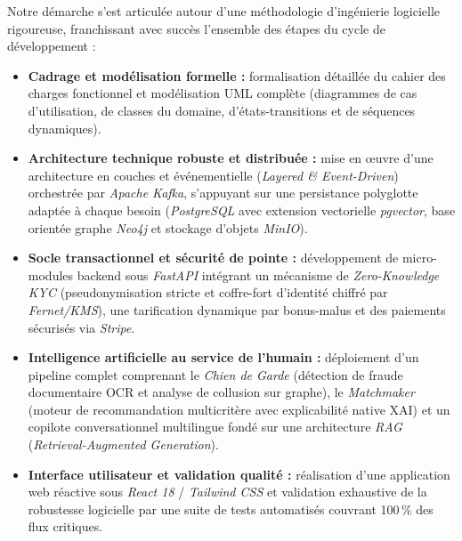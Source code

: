 \documentclass[12pt,a4paper]{report}
\begin{document}
Notre démarche s'est articulée autour d'une méthodologie d'ingénierie logicielle rigoureuse, franchissant avec succès l'ensemble des étapes du cycle de développement :
\begin{itemize}
    \item \textbf{Cadrage et modélisation formelle :} formalisation détaillée du cahier des charges fonctionnel et modélisation UML complète (diagrammes de cas d'utilisation, de classes du domaine, d'états-transitions et de séquences dynamiques).
    \item \textbf{Architecture technique robuste et distribuée :} mise en œuvre d'une architecture en couches et événementielle (\textit{Layered \& Event-Driven}) orchestrée par \textit{Apache Kafka}, s'appuyant sur une persistance polyglotte adaptée à chaque besoin (\textit{PostgreSQL} avec extension vectorielle \textit{pgvector}, base orientée graphe \textit{Neo4j} et stockage d'objets \textit{MinIO}).
    \item \textbf{Socle transactionnel et sécurité de pointe :} développement de micro-modules backend sous \textit{FastAPI} intégrant un mécanisme de \textit{Zero-Knowledge KYC} (pseudonymisation stricte et coffre-fort d'identité chiffré par \textit{Fernet/KMS}), une tarification dynamique par bonus-malus et des paiements sécurisés via \textit{Stripe}.
    \item \textbf{Intelligence artificielle au service de l'humain :} déploiement d'un pipeline complet comprenant le \textit{Chien de Garde} (détection de fraude documentaire OCR et analyse de collusion sur graphe), le \textit{Matchmaker} (moteur de recommandation multicritère avec explicabilité native XAI) et un copilote conversationnel multilingue fondé sur une architecture \textit{RAG} (\textit{Retrieval-Augmented Generation}).
    \item \textbf{Interface utilisateur et validation qualité :} réalisation d'une application web réactive sous \textit{React 18} / \textit{Tailwind CSS} et validation exhaustive de la robustesse logicielle par une suite de tests automatisés couvrant 100\,\% des flux critiques.
\end{itemize}
\end{document}
